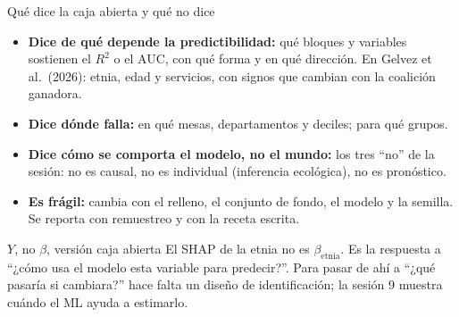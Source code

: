 \documentclass{beamer}
\newcommand{\1}{\mathbb{I}}
\begin{document}
\begin{frame}{Qué dice la caja abierta y qué no dice}
\small
\begin{itemize}\itemsep3pt
  \item \textbf{Dice de qué depende la predictibilidad:} qué bloques y variables sostienen el $R^2$ o el AUC, con qué forma y en qué dirección. En Gelvez et al.\ (2026): etnia, edad y servicios, con signos que cambian con la coalición ganadora. \pause
  \item \textbf{Dice dónde falla:} en qué mesas, departamentos y deciles; para qué grupos. \pause
  \item \textbf{Dice cómo se comporta el modelo, no el mundo:} los tres ``no'' de la sesión: no es causal, no es individual (inferencia ecológica), no es pronóstico. \pause
  \item \textbf{Es frágil:} cambia con el relleno, el conjunto de fondo, el modelo y la semilla. Se reporta con remuestreo y con la receta escrita.
\end{itemize}
\pause
\begin{block}{$Y$, no $\beta$, versión caja abierta}
El SHAP de la etnia no es $\beta_{\text{etnia}}$. Es la respuesta a ``¿cómo usa el modelo esta variable para predecir?''. Para pasar de ahí a ``¿qué pasaría si cambiara?'' hace falta un diseño de identificación; la sesión 9 muestra cuándo el ML ayuda a estimarlo.
\end{block}
\end{frame}
\end{document}
